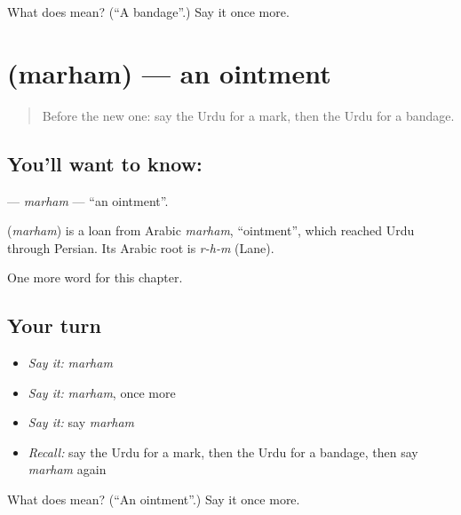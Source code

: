 \begin{tcolorbox}[breakable,colback=teal!4,colframe=teal!35!black,title={Before you move on}]
What does  mean? (\textquotedblleft{}A bandage\textquotedblright{}.) Say it once more.
\end{tcolorbox}
\section[\texorpdfstring{\ur{مرہم} (marham)}{مرہم (marham)}]{ (marham) — an ointment}

\label{lesson:UR-C244-marham}



\begin{quote}
Before the new one: say the Urdu for a mark, then the Urdu for a bandage.
\end{quote}

\subsection*{You'll want to know: }
\textbf{} — \emph{marham} — \textquotedblleft{}an ointment\textquotedblright{}.

\begin{cousinweb}
\textbf{} (\emph{marham}) is a loan from Arabic \emph{marham}, \textquotedblleft{}ointment\textquotedblright{}, which reached Urdu through Persian. Its Arabic root is \emph{r-h-m} (Lane).
\end{cousinweb}

\begin{grammarlens}[title={What you've built}]
One more word for this chapter.
\end{grammarlens}

\subsection*{Your turn}
\begin{itemize}
\raggedright
  \item \emph{Say it:} \emph{marham}
  \item \emph{Say it:} \emph{marham}, once more
  \item \emph{Say it:} say \emph{marham}
  \item \emph{Recall:} say the Urdu for a mark, then the Urdu for a bandage, then say \emph{marham} again
\end{itemize}

\begin{tcolorbox}[breakable,colback=teal!4,colframe=teal!35!black,title={Before you move on}]
What does  mean? (\textquotedblleft{}An ointment\textquotedblright{}.) Say it once more.
\end{tcolorbox}

